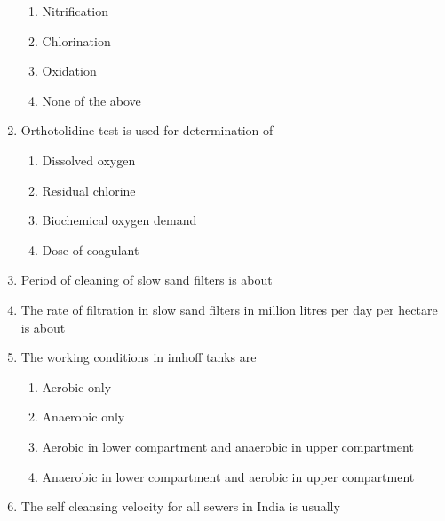 \documentclass[11pt,a4paper]{article}
\begin{document}
\begin{enumerate}
\begin{enumerate}[label=\Alph*.]
\item{Nitrification}
\item{Chlorination}
\item{Oxidation}
\item{None of the above}
\end{enumerate}
\item{Orthotolidine test is used for determination of}
\begin{enumerate}[label=\Alph*.]
\item{Dissolved oxygen}
\item{Residual chlorine}
\item{Biochemical oxygen demand}
\item{Dose of coagulant}
\end{enumerate}
\item{Period of cleaning of slow sand filters is about}
\\
\item{The rate of filtration in slow sand filters in million litres per day per hectare is about}
\\
\item{The working conditions in imhoff tanks are}
\begin{enumerate}[label=\Alph*.]
\item{Aerobic only}
\item{Anaerobic only}
\item{Aerobic in lower compartment and anaerobic in upper compartment}
\item{Anaerobic in lower compartment and aerobic in upper compartment}
\end{enumerate}
\item{The self cleansing velocity for all sewers in India is usually}
\begin{enumerate}[label=\Alph*.]

\end{enumerate}
\end{enumerate}
\end{document}
